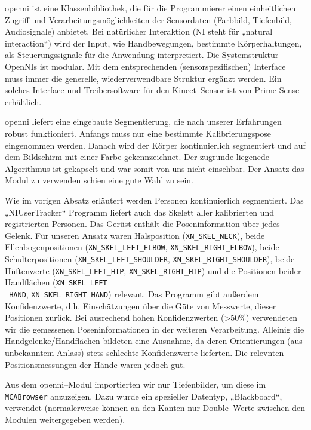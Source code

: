 \gls{openni} ist eine Klassenbibliothek, die für die Programmierer einen einheitlichen Zugriff und Verarbeitungsmöglichkeiten
 der Sensordaten (Farbbild, Tiefenbild, Audiosignale) anbietet. Bei natürlicher Interaktion (NI steht für „natural interaction“) wird der Input,
 wie Handbewegungen, bestimmte Körperhaltungen, als Steuerungssignale für die Anwendung interpretiert. Die Systemstruktur OpenNIs ist modular.
 Mit dem entsprechenden (sensorspezifischen) Interface muss immer die generelle, wiederverwendbare Struktur ergänzt werden.
 Ein solches Interface und Treibersoftware für den Kinect--Sensor ist von Prime
 Sense erhältlich. 

\gls{openni} liefert eine eingebaute Segmentierung, die nach unserer Erfahrungen robust funktioniert.
 Anfangs muss nur eine bestimmte Kalibrierungspose eingenommen werden. Danach wird der Körper kontinuierlich segmentiert und
 auf dem Bildschirm mit einer Farbe gekennzeichnet. Der zugrunde liegenede Algorithmus ist gekapselt und war somit von uns nicht einsehbar.
 Der Ansatz das Modul zu verwenden schien eine gute Wahl zu sein.

Wie im vorigen Absatz erläutert werden Personen kontinuierlich segmentiert. Das
„NIUserTracker“ Programm liefert auch das Skelett aller kalibrierten und registrierten Personen. Das Gerüst enthält die Poseninformation über jedes
 Gelenk. Für unseren Ansatz waren Halsposition (\lstinline{XN_SKEL_NECK}), beide
 Ellenbogenpositionen (\lstinline{XN_SKEL_LEFT_ELBOW},
 \lstinline{XN_SKEL_RIGHT_ELBOW}), beide Schulterpositionen
 (\lstinline{XN_SKEL_LEFT_SHOULDER}, \lstinline{XN_SKEL_RIGHT_SHOULDER}), beide
 Hüftenwerte (\lstinline{XN_SKEL_LEFT_HIP}, \lstinline{XN_SKEL_RIGHT_HIP}) und
 die Positionen beider Handflächen (\lstinline{XN_SKEL_LEFT}\\\lstinline{_HAND},
 \lstinline{XN_SKEL_RIGHT_HAND}) relevant. Das Programm gibt außerdem
 Konfidenzwerte, d.h. Einschätzungen über die Güte von Messwerte, dieser Positionen zurück.
 Bei ausrechend hohen Konfidenzwerten (>50\%) verwendeten wir die gemessenen
 Poseninformationen in der weiteren Verarbeitung. Alleinig die Handgelenke/Handflächen bildeten eine Ausnahme,
 da deren Orientierungen (aus unbekanntem Anlass) stets schlechte Konfidenzwerte lieferten. Die relevnten Positionsmessungen der Hände waren jedoch gut.

Aus dem \gls{openni}--Modul importierten wir nur Tiefenbilder, um diese im
\lstinline{MCABrowser} anzuzeigen. Dazu wurde ein spezieller Datentyp,
„Blackboard“, verwendet (normalerweise können an den Kanten nur Double--Werte zwischen den Modulen weitergegeben werden).

